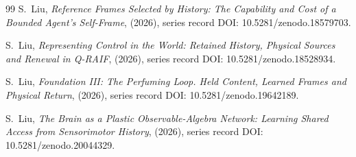 \documentclass[12pt,a4paper]{article}
\begin{document}
\begin{thebibliography}{99}
S.~Liu, \emph{Reference Frames Selected by History: The Capability and Cost of a Bounded Agent's Self-Frame}, (2026), series record DOI: 10.5281/zenodo.18579703.

S.~Liu, \emph{Representing Control in the World: Retained History, Physical Sources and Renewal in Q-RAIF}, (2026), series record DOI: 10.5281/zenodo.18528934.

S.~Liu, \emph{Foundation III: The Perfuming Loop. Held Content, Learned Frames and Physical Return}, (2026), series record DOI: 10.5281/zenodo.19642189.

S.~Liu, \emph{The Brain as a Plastic Observable-Algebra Network: Learning Shared Access from Sensorimotor History}, (2026), series record DOI: 10.5281/zenodo.20044329.

\end{thebibliography}
\end{document}

